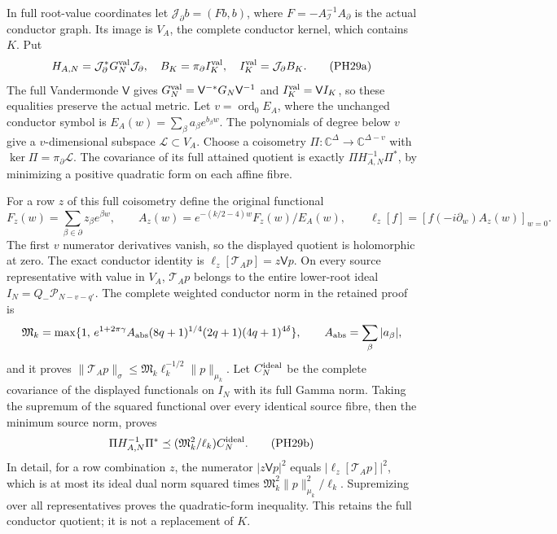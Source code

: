 \documentclass[10pt]{article}
\begin{document}
In full root-value coordinates let \(\mathcal J_\partial b=(F b,b)\), where \(F=-A_{\mathcal I}^{-1}A_\partial\) is the actual conductor graph. Its image is \(V_A\), the complete conductor kernel, which contains \(K\). Put \[
 H_{A,N}=\mathcal J_\partial^*G_N^{\rm val}\mathcal J_\partial,\quad
 B_K=\pi_\partial I_K^{\rm val},\quad
 I_K^{\rm val}=\mathcal J_\partial B_K .
 \tag{PH29a}
\] The full Vandermonde \(\mathsf V\) gives \(G_N^{\rm val}=\mathsf V^{-*}G_N\mathsf V^{-1}\) and \(I_K^{\rm val}=\mathsf V I_K\), so these equalities preserve the actual metric. Let \(v=\operatorname{ord}_0E_A\), where the unchanged conductor symbol is \(E_A(w)=\sum_\beta a_\beta e^{b_\beta w}\). The polynomials of degree below \(v\) give a \(v\)-dimensional subspace \(\mathcal L\subset V_A\). Choose a coisometry \(\Pi:\mathbb C^\Delta\to\mathbb C^{\Delta-v}\) with \(\ker\Pi=\pi_\partial\mathcal L\). The covariance of its full attained quotient is exactly \(\Pi H_{A,N}^{-1}\Pi^*\), by minimizing a positive quadratic form on each affine fibre.

For a row \(z\) of this full coisometry define the original functional \[
 F_z(w)=\sum_{\beta\in\partial}z_\beta e^{\beta w},\qquad
 A_z(w)=e^{-(k/2-4)w}F_z(w)/E_A(w),\qquad
 \ell_z[f]=[f(-i\partial_w)A_z(w)]_{w=0}.
\] The first \(v\) numerator derivatives vanish, so the displayed quotient is holomorphic at zero. The exact conductor identity is \(\ell_z[\mathcal T_Ap]=z\mathsf Vp\). On every source representative with value in \(V_A\), \(\mathcal T_Ap\) belongs to the entire lower-root ideal \(I_N=Q_-\mathcal P_{N-v-q'}\). The complete weighted conductor norm in the retained proof is \[
 \mathfrak M_k=\max\{1,\,
 e^{1+2\pi\gamma}A_{\rm abs}(8q+1)^{1/4}
 (2q+1)(4q+1)^{4\delta}\},\qquad
 A_{\rm abs}=\sum_\beta|a_\beta|,
\] and it proves \(\|\mathcal T_Ap\|_\sigma
\le\mathfrak M_k\ell_k^{-1/2}\|p\|_{\mu_k}\). Let \(C_N^{\rm ideal}\) be the complete covariance of the displayed functionals on \(I_N\) with its full Gamma norm. Taking the supremum of the squared functional over every identical source fibre, then the minimum source norm, proves \[
 \Pi H_{A,N}^{-1}\Pi^*
 \preceq(\mathfrak M_k^2/\ell_k)C_N^{\rm ideal}.
 \tag{PH29b}
\] In detail, for a row combination \(z\), the numerator \(|z\mathsf Vp|^2\) equals \(|\ell_z[\mathcal T_Ap]|^2\), which is at most its ideal dual norm squared times \(\mathfrak M_k^2\|p\|_{\mu_k}^2/\ell_k\). Supremizing over all representatives proves the quadratic-form inequality. This retains the full conductor quotient; it is not a replacement of \(K\).
\end{document}
